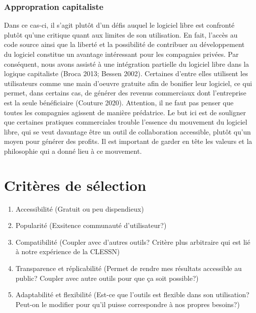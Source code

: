 \documentclass[
  letterpaper,
]{scrbook}
\begin{document}
\hypertarget{appropration-capitaliste}{%
\subsubsection{Appropration
capitaliste}\label{appropration-capitaliste}}

Dans ce cas-ci, il s'agit plutôt d'un défis auquel le logiciel libre est
confronté plutôt qu'une critique quant aux limites de son utilisation.
En fait, l'accès au code source ainsi que la liberté et la possibilité
de contribuer au développement du logiciel constitue un avantage
intéressant pour les compagnies privées. Par conséquent, nous avons
assisté à une intégration partielle du logiciel libre dans la logique
capitaliste (Broca 2013; Bessen 2002). Certaines d'entre elles utilisent
les utilisateurs comme une main d'oeuvre gratuite afin de bonifier leur
logiciel, ce qui permet, dans certains cas, de générer des revenus
commerciaux dont l'entreprise est la seule bénéficiaire (Couture 2020).
Attention, il ne faut pas penser que toutes les compagnies agissent de
manière prédatrice. Le but ici est de souligner que certaines pratiques
commerciales trouble l'essence du mouvement du logiciel libre, qui se
veut davantage être un outil de collaboration accessible, plutôt qu'un
moyen pour générer des profits. Il est important de garder en tête les
valeurs et la philosophie qui a donné lieu à ce mouvement.

\hypertarget{crituxe8res-de-suxe9lection}{%
\section{Critères de sélection}\label{crituxe8res-de-suxe9lection}}

\begin{enumerate}
\def\labelenumi{\arabic{enumi}.}
\item
  Accessibilité (Gratuit ou peu dispendieux)
\item
  Popularité (Exsitence communauté d'utilisateur?)
\item
  Compatibilité (Coupler avec d'autres outils? Critère plus arbitraire
  qui est lié à notre expérience de la CLESSN)
\item
  Transparence et réplicabilité (Permet de rendre mes résultats
  accessible au public? Coupler avec autre outils pour que ça soit
  possible?)
\item
  Adaptabilité et flexibilité (Est-ce que l'outils est flexible dans son
  utilisation? Peut-on le modifier pour qu'il puisse correspondre à nos
  propres besoins?)
\end{enumerate}
\end{document}
